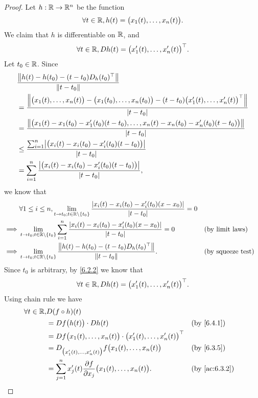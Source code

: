 \begin{proof}
  Let \(h : \R \to \R^n\) be the function
  \[
    \forall t \in \R, h(t) = \big(x_1(t), \dots, x_n(t)\big).
  \]
  We claim that \(h\) is differentiable on \(\R\), and
  \[
    \forall t \in \R, D h(t) = \big(x_1'(t), \dots, x_n'(t)\big)^\top.
  \]
  Let \(t_0 \in \R\).
  Since
  \begin{align*}
     & \dfrac{\norm*{h(t) - h(t_0) - (t - t_0) D_h(t_0)^\top}}{\norm*{t - t_0}}                                                                                  \\
     & = \dfrac{\norm*{\big(x_1(t), \dots, x_n(t)\big) - \big(x_1(t_0), \dots, x_n(t_0)\big) - (t - t_0) \big(x_1'(t), \dots, x_n'(t)\big)^\top}}{\abs{t - t_0}} \\
     & = \dfrac{\norm*{\big(x_1(t) - x_1(t_0) - x_1'(t_0)(t - t_0), \dots, x_n(t) - x_n(t_0) - x_n'(t_0)(t - t_0)\big)}}{\abs{t - t_0}}                          \\
     & \leq \dfrac{\sum_{i = 1}^n \abs{\big(x_i(t) - x_i(t_0) - x_i'(t_0)(t - t_0)\big)}}{\abs{t - t_0}}                                                         \\
     & = \sum_{i = 1}^n \dfrac{\abs{\big(x_i(t) - x_i(t_0) - x_i'(t_0)(t - t_0)\big)}}{\abs{t - t_0}},
  \end{align*}
  we know that
  \begin{align*}
             & \forall 1 \leq i \leq n, \lim_{t \to t_0 ; t \in \R \setminus \{t_0\}} \dfrac{\abs{x_i(t) - x_i(t_0) - x_i'(t_0)(x - x_0)}}{\abs{t - t_0}} = 0                               \\
    \implies & \lim_{t \to t_0 ; t \in \R \setminus \{t_0\}} \sum_{i = 1}^n \dfrac{\abs{x_i(t) - x_i(t_0) - x_i'(t_0)(x - x_0)}}{\abs{t - t_0}} = 0           &  & \text{(by limit laws)}   \\
    \implies & \lim_{t \to t_0 ; t \in \R \setminus \{t_0\}} \dfrac{\norm*{h(t) - h(t_0) - (t - t_0) D_h(t_0)^\top}}{\norm*{t - t_0}}.                        &  & \text{(by squeeze test)}
  \end{align*}
  Since \(t_0\) is arbitrary, by \cref{6.2.2} we know that
  \[
    \forall t \in \R, D h(t) = \big(x_1'(t), \dots, x_n'(t)\big)^\top.
  \]
  Using chain rule we have
  \begin{align*}
    \forall t \in \R, & D (f \circ h)(t)                                                                                             \\
                      & = D f\big(h(t)\big) \cdot D h(t)                                                          &  & \by{6.4.1}    \\
                      & = D f\big(x_1(t), \dots, x_n(t)\big) \cdot \big(x_1'(t), \dots, x_n'(t)\big)^\top                            \\
                      & = D_{\big(x_1'(t), \dots, x_n'(t)\big)} f\big(x_1(t), \dots, x_n(t)\big)                  &  & \by{6.3.5}    \\
                      & = \sum_{j = 1}^n x_j'(t) \dfrac{\partial f}{\partial x_j}\big(x_1(t), \dots, x_n(t)\big). &  & \by{ac:6.3.2}
  \end{align*}
\end{proof}

